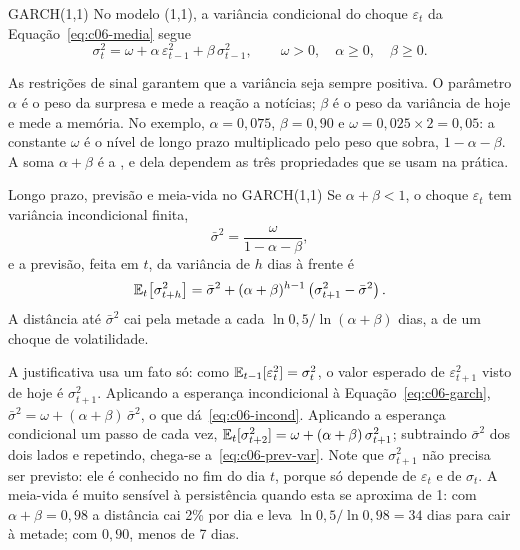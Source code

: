 \begin{definicao}{GARCH(1,1)}
No modelo (1,1), a variância condicional do choque $\varepsilon_t$ da Equação~\eqref{eq:c06-media} segue
\begin{equation}
  \sigma_t^2 = \omega + \alpha\,\varepsilon_{t-1}^2 + \beta\,\sigma_{t-1}^2 , \qquad \omega > 0 , \quad \alpha \ge 0 , \quad \beta \ge 0 .
  \label{eq:c06-garch}
\end{equation}
\end{definicao}

As restrições de sinal garantem que a variância seja sempre positiva. O parâmetro $\alpha$ é o peso da surpresa e mede a reação a notícias; $\beta$ é o peso da variância de hoje e mede a memória. No exemplo, $\alpha = 0,075$, $\beta = 0,90$ e $\omega = 0,025 \times 2 = 0,05$: a constante $\omega$ é o nível de longo prazo multiplicado pelo peso que sobra, $1 - \alpha - \beta$. A soma $\alpha + \beta$ é a , e dela dependem as três propriedades que se usam na prática.

\begin{resultado}{Longo prazo, previsão e meia-vida no GARCH(1,1)}
Se $\alpha + \beta < 1$, o choque $\varepsilon_t$ tem variância incondicional finita,
\begin{equation}
  \bar\sigma^2 = \frac{\omega}{1 - \alpha - \beta} ,
  \label{eq:c06-incond}
\end{equation}
e a previsão, feita em $t$, da variância de $h$ dias à frente é
\begin{equation}
  \operatorname{\mathbb{E}}_t\!\left[\sigma_{t+h}^2\right] = \bar\sigma^2 + (\alpha+\beta)^{h-1}\left(\sigma_{t+1}^2 - \bar\sigma^2\right) .
  \label{eq:c06-prev-var}
\end{equation}
A distância até $\bar\sigma^2$ cai pela metade a cada $\ln 0,5 / \ln(\alpha+\beta)$ dias, a  de um choque de volatilidade.
\end{resultado}

A justificativa usa um fato só: como $\operatorname{\mathbb{E}}_{t-1}[\varepsilon_t^2] = \sigma_t^2$, o valor esperado de $\varepsilon_{t+1}^2$ visto de hoje é $\sigma_{t+1}^2$. Aplicando a esperança incondicional à Equação~\eqref{eq:c06-garch}, $\bar\sigma^2 = \omega + (\alpha+\beta)\,\bar\sigma^2$, o que dá~\eqref{eq:c06-incond}. Aplicando a esperança condicional um passo de cada vez, $\operatorname{\mathbb{E}}_t[\sigma_{t+2}^2] = \omega + (\alpha+\beta)\,\sigma_{t+1}^2$; subtraindo $\bar\sigma^2$ dos dois lados e repetindo, chega-se a~\eqref{eq:c06-prev-var}. Note que $\sigma_{t+1}^2$ não precisa ser previsto: ele é conhecido no fim do dia $t$, porque só depende de $\varepsilon_t$ e de $\sigma_t$. A meia-vida é muito sensível à persistência quando esta se aproxima de 1: com $\alpha + \beta = 0,98$ a distância cai 2\% por dia e leva $\ln 0,5/\ln 0,98 = 34$ dias para cair à metade; com $0,90$, menos de 7 dias.

